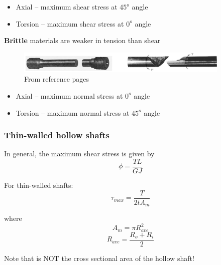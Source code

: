 \begin{multicols}{2}
\begin{itemize}
    \item Axial – maximum shear stress at $45^o$ angle
    \item Torsion – maximum shear stress at $0^o$ angle
\end{itemize}
\end{multicols}

 
\noindent \textbf{Brittle} materials are weaker in tension than shear
\begin{figure}[!h]
\centering
\includegraphics[angle=0, width=4in]{Torsion-Figures/brittle.png}
\vspace{-2mm}
\caption{\small From reference pages}
\vspace{-3mm}
\label{Fig:Brittle}
\end{figure}

\begin{multicols}{2}
\begin{itemize}
    \item Axial – maximum normal stress at $0^o$ angle
    \item Torsion – maximum normal stress at $45^o$ angle
\end{itemize}
\end{multicols}


\subsubsection{Thin-walled hollow shafts }

In general, the maximum shear stress is given by \[\phi = \frac{TL}{GJ}\]

\noindent For thin-walled shafts: \[\tau_{max} = \frac{T}{2tA_m}\]

\noindent where \[A_m = \pi R_{ave}^2\] \[R_{ave} = \frac{R_o + R_i}{2}\]

\noindent Note that is NOT the cross sectional area of the hollow shaft!



\subsubsection{}

